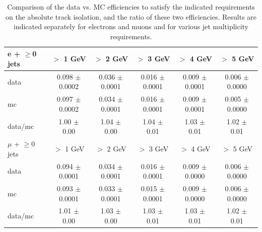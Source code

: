 \begin{table}[!ht]
\begin{center}
\caption{\label{tab:isotrk} Comparison of the data vs. MC efficiencies to satisfy the indicated requirements
on the absolute track isolation, and the ratio of these two efficiencies. Results are indicated separately for electrons and muons and for various
jet multiplicity requirements.}
\begin{tabular}{l|c|c|c|c|c}


\hline
\hline
e + $\geq$0 jets   &           $>$ 1 GeV   &           $>$ 2 GeV   &           $>$ 3 GeV   &           $>$ 4 GeV   &           $>$ 5 GeV  \\
\hline
      data   &  0.098 $\pm$ 0.0002   &  0.036 $\pm$ 0.0001   &  0.016 $\pm$ 0.0001   &  0.009 $\pm$ 0.0001   &  0.006 $\pm$ 0.0000  \\
        mc   &  0.097 $\pm$ 0.0002   &  0.034 $\pm$ 0.0001   &  0.016 $\pm$ 0.0001   &  0.009 $\pm$ 0.0001   &  0.005 $\pm$ 0.0000  \\
   data/mc   &     1.00 $\pm$ 0.00   &     1.04 $\pm$ 0.00   &     1.04 $\pm$ 0.01   &     1.03 $\pm$ 0.01   &     1.02 $\pm$ 0.01  \\

\hline
\hline
$\mu$ + $\geq$0 jets   &           $>$ 1 GeV   &           $>$ 2 GeV   &           $>$ 3 GeV   &           $>$ 4 GeV   &           $>$ 5 GeV  \\
\hline
      data   &  0.094 $\pm$ 0.0001   &  0.034 $\pm$ 0.0001   &  0.016 $\pm$ 0.0001   &  0.009 $\pm$ 0.0000   &  0.006 $\pm$ 0.0000  \\
        mc   &  0.093 $\pm$ 0.0001   &  0.033 $\pm$ 0.0001   &  0.015 $\pm$ 0.0001   &  0.009 $\pm$ 0.0000   &  0.006 $\pm$ 0.0000  \\
   data/mc   &     1.01 $\pm$ 0.00   &     1.03 $\pm$ 0.00   &     1.03 $\pm$ 0.01   &     1.03 $\pm$ 0.01   &     1.02 $\pm$ 0.01  \\


\end{tabular}
\end{center}
\end{table}

